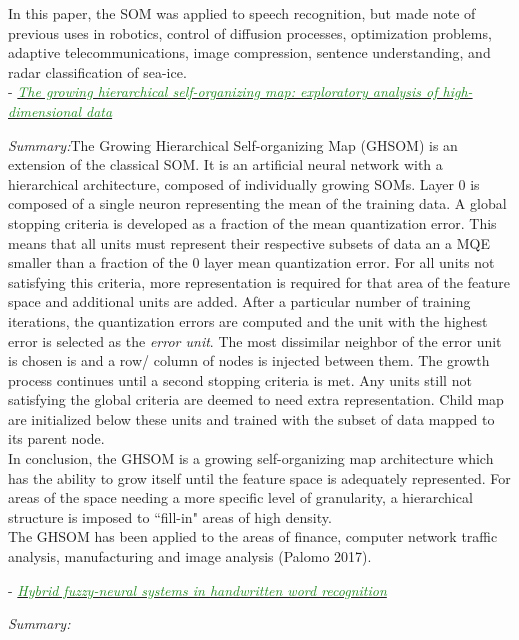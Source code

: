 \documentclass[]{article}
\newcommand{\paperentry}[4]{
            \hangindent=1cm
            \cite{#1} - \href{run:../References/#3}{\textcolor{ForestGreen}{\textit{#2}}}
            
            \noindent            
            \begin{minipage}[t]{0.1\linewidth}\hfill\end{minipage}
            \begin{minipage}[t]{0.8\linewidth}\textcolor{NavyBlue}{{\textit{Summary:}}}#4\end{minipage}
            \vspace{.25cm}
          }
\begin{document}
	In this paper, the SOM was applied to speech recognition, but made note of previous uses in robotics, control of diffusion processes, optimization problems, adaptive telecommunications, image compression, sentence understanding, and radar classification of sea-ice. \\
	
 
	 \paperentry{Rauber2002GHSOM}
	 {The growing hierarchical self-organizing map: exploratory analysis of high-dimensional data}
	 {Manifold_Representation_Learning/CHL/Rauber2002GHSOM.pdf}
	 {The Growing Hierarchical Self-organizing Map (GHSOM) is an extension of the classical SOM.  It is an artificial neural network with a hierarchical architecture, composed of individually growing SOMs.  Layer 0 is composed of a single neuron representing the mean of the training data.  A global stopping criteria is developed as a fraction of the mean quantization error.  This means that all units must represent their respective subsets of data an a MQE smaller than a fraction of the 0 layer mean quantization error.  For all units not satisfying this criteria, more representation is required for that  area of the feature  space and additional units are added.  After a particular number of training iterations, the quantization errors are computed and the unit with the highest error is selected as the \textit{error unit}. The most dissimilar neighbor of the error unit is chosen is and a row/ column of nodes is injected between them.  The growth process continues until a second stopping criteria is met.  Any units still not satisfying the global criteria are deemed to need extra representation.  Child map are initialized below these units and trained with the subset of data mapped to its parent node.\\
	 	
 	\noindent
 	In conclusion, the GHSOM is a growing self-organizing map architecture which has the ability to grow itself until the feature space  is adequately represented.  For areas of the space needing a more specific level of granularity, a hierarchical structure is imposed to ``fill-in" areas of high density. \\
 	
 	\noindent
 	The GHSOM has been applied to the areas of finance, computer network traffic analysis, manufacturing and image analysis (Palomo 2017).
	}
 
	 \paperentry{Chiang1997HandWrittenWords}
	 {Hybrid fuzzy-neural systems in handwritten word recognition}
	 {Manifold_Representation_Learning/CHL/Chiang1997HandWrittenWords.pdf}
	 {}
	
\end{document}
